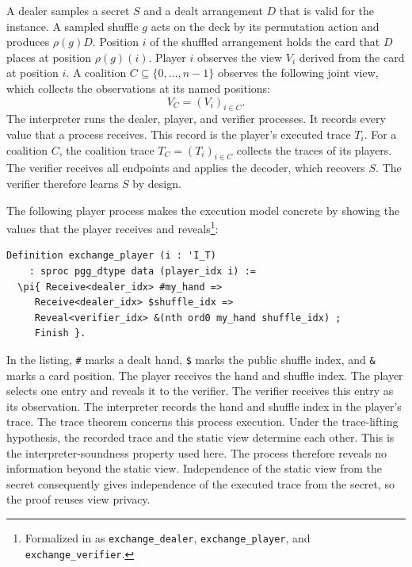 \documentclass[runningheads]{llncs}
\newcommand{\coqin}[1]{\texttt{#1}}
\begin{document}
A dealer samples a secret $S$ and a dealt arrangement $D$ that is valid for
the instance. A sampled shuffle $g$ acts on the deck by its permutation action
and produces $\rho(g)D$. Position $i$ of the shuffled arrangement holds the
card that $D$ places at position $\rho(g)(i)$. Player $i$ observes the view
$V_i$ derived from the card at position $i$. A coalition
$C\subseteq\{0,\ldots,n-1\}$ observes the following joint view, which collects
the observations at its named positions:
\begin{equation}
  V_C=(V_i)_{i\in C}.
  \label{eq:coalition-view}
\end{equation}
The interpreter runs the dealer, player, and verifier processes. It records
every value that a process receives. This record is the player's executed
trace $T_i$. For a coalition $C$, the coalition trace $T_C=(T_i)_{i\in C}$
collects the traces of its players. The verifier receives all endpoints and
applies the decoder, which recovers $S$. The verifier therefore learns $S$ by
design.

The following player process makes the execution model concrete by showing the
values that the player receives and reveals\footnote{Formalized in
 as
\coqin{exchange\_dealer}, \coqin{exchange\_player}, and
\coqin{exchange\_verifier}.}:

\begin{lstlisting}
Definition exchange_player (i : 'I_T)
    : sproc pgg_dtype data (player_idx i) :=
  \pi{ Receive<dealer_idx> #my_hand =>
     Receive<dealer_idx> $shuffle_idx =>
     Reveal<verifier_idx> &(nth ord0 my_hand shuffle_idx) ;
     Finish }.
\end{lstlisting}

In the listing, \coqin{\#} marks a dealt hand, \coqin{\$} marks the public
shuffle index, and \coqin{\&} marks a card position. The player receives the
hand and shuffle index. The player selects one entry and reveals it to the
verifier. The verifier receives this entry as its observation. The interpreter
records the hand and shuffle index in the player's trace. The trace theorem
concerns this process execution. Under the trace-lifting hypothesis, the
recorded trace and the static view determine each other. This is the
interpreter-soundness property used here. The process therefore reveals no
information beyond the static view. Independence of the static view from the
secret consequently gives independence of the executed trace from the secret,
so the proof reuses view privacy.
\end{document}
